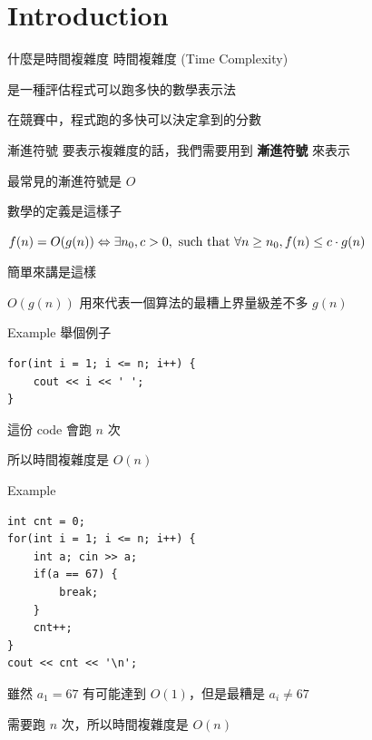 \section{Introduction}

\begin{frame}{什麼是時間複雜度}
    時間複雜度 (Time Complexity)

    是一種評估程式可以跑多快的數學表示法\pause

    在競賽中，程式跑的多快可以決定拿到的分數
\end{frame}

\begin{frame}{漸進符號}
    要表示複雜度的話，我們需要用到 \textbf{漸進符號} 來表示

    最常見的漸進符號是 $O$\pause

    數學的定義是這樣子

    \begin{definition}[$O$]
        $f(n) = O(g(n)) \Leftrightarrow \exists \space n_0, c > 0, \text{ such that } \forall n \ge n_0, f(n) \le c \cdot g(n)$
    \end{definition}\pause

    簡單來講是這樣

    \begin{definition}[$O$]
        $O(g(n))$ 用來代表一個算法的最糟上界量級差不多 $g(n)$
    \end{definition}
\end{frame}

\begin{frame}[fragile]{Example}
    舉個例子

\begin{lstlisting}
for(int i = 1; i <= n; i++) {
    cout << i << ' ';
}
\end{lstlisting}

這份 code 會跑 $n$ 次

所以時間複雜度是 $O(n)$
\end{frame}

\begin{frame}[fragile]{Example}
\begin{lstlisting}
int cnt = 0;
for(int i = 1; i <= n; i++) {
    int a; cin >> a;
    if(a == 67) {
        break;
    }
    cnt++;
}
cout << cnt << '\n';
\end{lstlisting}\pause

雖然 $a_1 = 67$ 有可能達到 $O(1)$，但是最糟是 $a_i \neq 67$

需要跑 $n$ 次，所以時間複雜度是 $O(n)$
\end{frame}


